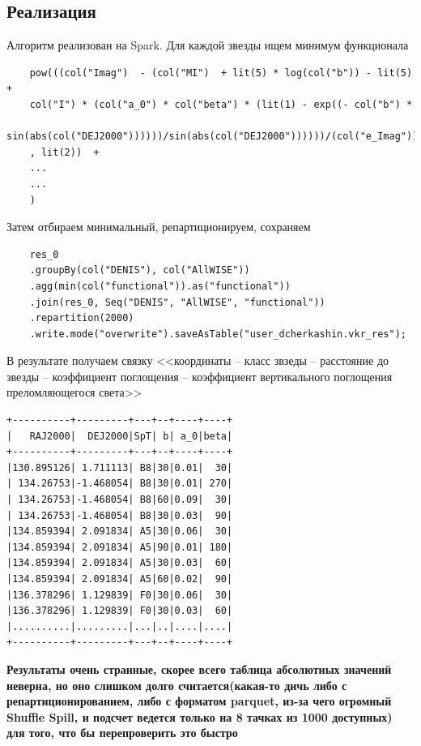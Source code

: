\documentclass[12pt, a4paper]{article}
\begin{document}
	\subsection*{Реализация}
	Алгоритм реализован на Spark. Для каждой звезды ищем минимум функционала
	\begin{verbatim}
    pow(((col("Imag")  - (col("MI")  + lit(5) * log(col("b")) - lit(5) +
    col("I") * (col("a_0") * col("beta") * (lit(1) - exp((- col("b") *
    sin(abs(col("DEJ2000"))))))/sin(abs(col("DEJ2000"))))))/(col("e_Imag")))
    , lit(2))  +
    ...
    ...
    )
    \end{verbatim}
	Затем отбираем минимальный, репартиционируем, сохраняем
	\newline
	\begin{verbatim}
	res_0
	.groupBy(col("DENIS"), col("AllWISE"))
	.agg(min(col("functional")).as("functional"))
	.join(res_0, Seq("DENIS", "AllWISE", "functional"))
	.repartition(2000)
	.write.mode("overwrite").saveAsTable("user_dcherkashin.vkr_res");
	\end{verbatim}
	В результате получаем связку <<координаты -- класс звзеды -- расстояние до звезды -- коэффициент поглощения -- коэффициент вертикального поглощения преломляющегося света>>
	\begin{verbatim}
+----------+---------+---+--+----+----+
|   RAJ2000|  DEJ2000|SpT| b| a_0|beta|
+----------+---------+---+--+----+----+
|130.895126| 1.711113| B8|30|0.01|  30|
| 134.26753|-1.468054| B8|30|0.01| 270|
| 134.26753|-1.468054| B8|60|0.09|  30|
| 134.26753|-1.468054| B8|30|0.03|  90|
|134.859394| 2.091834| A5|30|0.06|  30|
|134.859394| 2.091834| A5|90|0.01| 180|
|134.859394| 2.091834| A5|30|0.03|  60|
|134.859394| 2.091834| A5|60|0.02|  90|
|136.378296| 1.129839| F0|30|0.06|  30|
|136.378296| 1.129839| F0|30|0.03|  60|
|..........|.........|...|..|....|....|
+----------+---------+---+--+----+----+
\end{verbatim}
\textbf{Результаты очень странные, скорее всего таблица абсолютных значений неверна, но оно слишком долго считается(какая-то дичь либо с репартиционированием, либо с форматом parquet, из-за чего огромный Shuffle Spill, и подсчет ведется только на 8 тачках из 1000 доступных) для того, что бы перепроверить это быстро}
\end{document}
